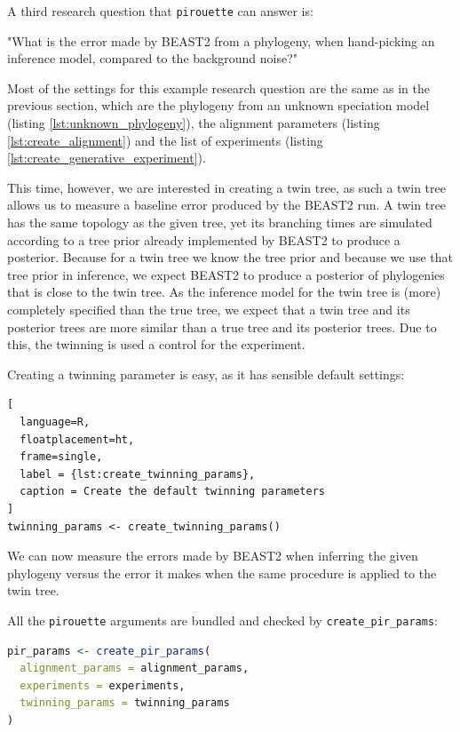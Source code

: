 \documentclass{article}
\begin{document}
A third research question that \verb;pirouette; can answer is:

"What is the error made by BEAST2 from a phylogeny, 
when hand-picking an inference model, compared to the background noise?"

Most of the settings for this example research question are
the same as in the previous section, which are
the phylogeny from an unknown speciation model (listing \ref{lst:unknown_phylogeny}), 
the alignment parameters (listing \ref{lst:create_alignment}) 
and the list of experiments (listing \ref{lst:create_generative_experiment}).

This time, however, we are interested in creating a twin tree,
as such a twin tree allows us to measure a baseline error produced
by the BEAST2 run.
A twin tree
has the same topology as the given tree, 
yet its branching times are simulated according 
to a tree prior already implemented by BEAST2 to produce a posterior. 
Because for a twin tree we know the tree prior 
and because we use that tree prior in inference, 
we expect BEAST2 to produce a posterior of phylogenies
that is close to the twin tree.
As the inference model for the twin tree is (more) completely
specified than the true tree, 
we expect that a twin tree and its posterior trees are more similar
than a true tree and its posterior trees.
Due to this, the twinning is used a control for the experiment.

Creating a twinning parameter is easy, as it has sensible default settings:

\begin{lstlisting}[
  language=R, 
  floatplacement=ht, 
  frame=single,
  label = {lst:create_twinning_params},
  caption = Create the default twinning parameters
]
twinning_params <- create_twinning_params()
\end{lstlisting}

We can now measure the errors made by BEAST2 
when inferring the given phylogeny 
versus the error it makes when the same procedure is applied to the twin tree.

All the \verb;pirouette; arguments are bundled and checked by \verb;create_pir_params;:

\begin{lstlisting}[language=R, floatplacement=ht, frame=single]
pir_params <- create_pir_params(
  alignment_params = alignment_params,
  experiments = experiments,
  twinning_params = twinning_params
)
\end{lstlisting}
\end{document}
